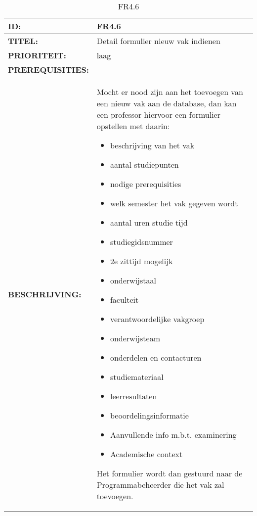 \noindent\begin{table}[h]
            \begin{tabular}{l | p{10cm}} 
                \textbf{ID:} & FR4.6 \\ \hline
                \textbf{TITEL:} & Detail formulier nieuw vak indienen\\ \hline
                \textbf{PRIORITEIT:} &  laag \\ \hline
                \textbf{PREREQUISITIES:} & \\ \hline
                \textbf{BESCHRIJVING:} & Mocht er nood zijn aan het toevoegen van een nieuw vak aan de database, dan kan een professor hiervoor een formulier opstellen met daarin:
        \begin{itemize}\itemsep1pt \parskip0pt \parsep0pt
                                        \item beschrijving van het vak
                                        \item aantal studiepunten
                                        \item nodige prerequisities
                                        \item welk semester het vak gegeven wordt
                                        \item aantal uren studie tijd
                                        \item studiegidsnummer
                                        \item 2e zittijd mogelijk
                                        \item onderwijstaal
                                        \item faculteit
                                        \item verantwoordelijke vakgroep
                                        \item onderwijsteam
                                        \item onderdelen en contacturen
                                        \item studiemateriaal
                                        \item leerresultaten
                                        \item beoordelingsinformatie
                                        \item Aanvullende info m.b.t. examinering
                                        \item Academische context
                                        \end{itemize}
                                        Het formulier wordt dan gestuurd naar de Programmabeheerder die het vak zal toevoegen. 
            \end{tabular}\\
            \caption{FR4.6}
            \label{tab:FR4.6}
        \end{table}
        
